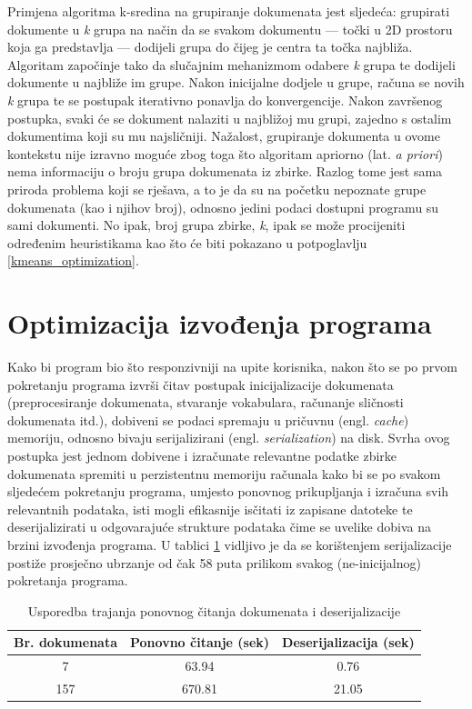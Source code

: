 \documentclass[times, utf8, zavrsni]{fer}
\begin{document}
Primjena algoritma k-sredina na grupiranje dokumenata jest sljedeća: grupirati dokumente u \textit{k} grupa na način da se svakom dokumentu — točki u 2D prostoru koja ga predstavlja — dodijeli grupa do čijeg je centra ta točka najbliža. Algoritam započinje tako da slučajnim mehanizmom odabere \textit{k} grupa te dodijeli dokumente u najbliže im grupe. Nakon inicijalne dodjele u grupe, računa se novih \textit{k} grupa te se postupak iterativno ponavlja do konvergencije. Nakon završenog postupka, svaki će se dokument nalaziti u najbližoj mu grupi, zajedno s ostalim dokumentima koji su mu najsličniji.
Nažalost, grupiranje dokumenta u ovome kontekstu nije izravno moguće zbog toga što algoritam apriorno (lat. \textit{a priori}) nema informaciju o broju grupa dokumenata iz zbirke. Razlog tome jest sama priroda problema koji se rješava, a to je da su na početku nepoznate grupe dokumenata (kao i njihov broj), odnosno jedini podaci dostupni programu su sami dokumenti. No ipak, broj grupa zbirke, \textit{k}, ipak se može procijeniti određenim heuristikama kao što će biti pokazano u potpoglavlju \ref{kmeans_optimization}.

\section{Optimizacija izvođenja programa}
Kako bi program bio što responzivniji na upite korisnika, nakon što se po prvom pokretanju programa izvrši čitav postupak inicijalizacije dokumenata (preprocesiranje dokumenata, stvaranje vokabulara, računanje sličnosti dokumenata itd.), dobiveni se podaci spremaju u pričuvnu (engl. \textit{cache}) memoriju, odnosno bivaju serijalizirani (engl. \textit{serialization}) na disk. Svrha ovog postupka jest jednom dobivene i izračunate relevantne podatke zbirke dokumenata spremiti u perzistentnu memoriju računala kako bi se po svakom sljedećem pokretanju programa, umjesto ponovnog prikupljanja i izračuna svih relevantnih podataka, isti mogli efikasnije isčitati iz zapisane datoteke te deserijalizirati u odgovarajuće strukture podataka čime se uvelike dobiva na brzini izvođenja programa. U tablici
\ref{table:serialization} vidljivo je da se korištenjem serijalizacije postiže prosječno ubrzanje od čak 58 puta prilikom svakog (ne-inicijalnog) pokretanja programa.

\begin{table}
\begin{center}
\begin{tabular}{|c|c|c|}
\hline
Br. dokumenata & Ponovno čitanje (sek) & Deserijalizacija (sek) \\
\hline
7 & 63.94 & 0.76 \\
157 & 670.81 & 21.05 \\
\hline
\end{tabular}
\end{center}
\caption{Usporedba trajanja ponovnog čitanja dokumenata i deserijalizacije}
\label{table:serialization}
\end{table}
\end{document}

